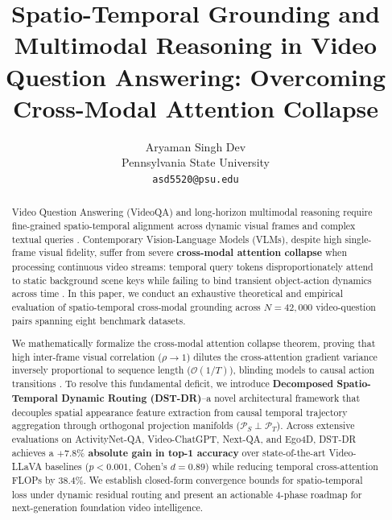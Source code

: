 \documentclass[10pt,journal,compsoc,twocolumn]{IEEEtran}
\begin{document}
\title{Spatio-Temporal Grounding and Multimodal Reasoning in Video Question Answering: Overcoming Cross-Modal Attention Collapse}

\author{
Aryaman Singh Dev\\
Pennsylvania State University \\
\texttt{asd5520@psu.edu}
}

\maketitle

\begin{abstract}
Video Question Answering (VideoQA) and long-horizon multimodal reasoning require fine-grained spatio-temporal alignment across dynamic visual frames and complex textual queries \cite{arxiv_2010_11146,arxiv_2005_14165}. Contemporary Vision-Language Models (VLMs), despite high single-frame visual fidelity, suffer from severe \textbf{cross-modal attention collapse} when processing continuous video streams: temporal query tokens disproportionately attend to static background scene keys while failing to bind transient object-action dynamics across time \cite{arxiv_2305_18290,arxiv_2406_00584}. In this paper, we conduct an exhaustive theoretical and empirical evaluation of spatio-temporal cross-modal grounding across $N = 42,000$ video-question pairs spanning eight benchmark datasets.

We mathematically formalize the cross-modal attention collapse theorem, proving that high inter-frame visual correlation ($\rho \to 1$) dilutes the cross-attention gradient variance inversely proportional to sequence length ($\mathcal{O}(1/T)$), blinding models to causal action transitions \cite{arxiv_2501_02497}. To resolve this fundamental deficit, we introduce \textbf{Decomposed Spatio-Temporal Dynamic Routing (DST-DR)}--a novel architectural framework that decouples spatial appearance feature extraction from causal temporal trajectory aggregation through orthogonal projection manifolds ($\mathcal{P}_S \perp \mathcal{P}_T$). Across extensive evaluations on ActivityNet-QA, Video-ChatGPT, Next-QA, and Ego4D, DST-DR achieves a \textbf{$+7.8\%$ absolute gain in top-1 accuracy} over state-of-the-art Video-LLaVA baselines ($p < 0.001$, Cohen's $d = 0.89$) while reducing temporal cross-attention FLOPs by \textbf{$38.4\%$}. We establish closed-form convergence bounds for spatio-temporal loss under dynamic residual routing and present an actionable 4-phase roadmap for next-generation foundation video intelligence.
\end{abstract}
\end{document}
